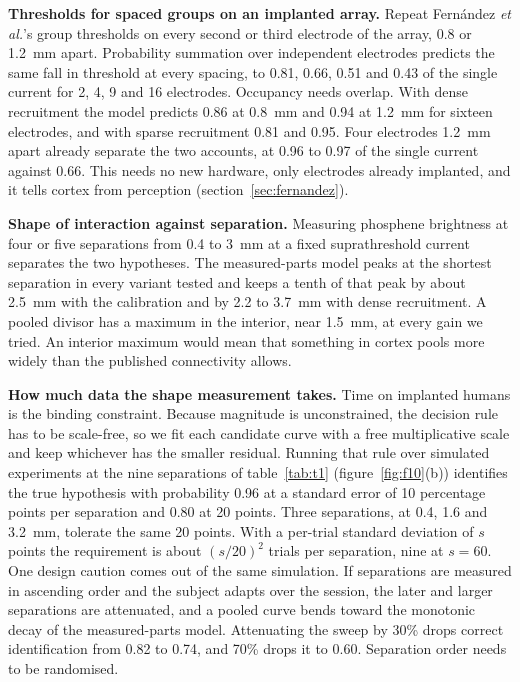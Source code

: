\documentclass[10pt,twocolumn]{article}
\begin{document}
\textbf{Thresholds for spaced groups on an implanted array.} Repeat
Fern\'andez \textit{et al.}'s group thresholds on every second or third
electrode of the array, 0.8 or 1.2~mm apart. Probability summation over
independent electrodes predicts the same fall in threshold at every
spacing, to 0.81, 0.66, 0.51 and 0.43 of the single current for 2, 4, 9
and 16 electrodes. Occupancy needs overlap. With dense recruitment the
model predicts 0.86 at 0.8~mm and 0.94 at 1.2~mm for sixteen electrodes,
and with sparse recruitment 0.81 and 0.95. Four electrodes 1.2~mm apart
already separate the two accounts, at 0.96 to 0.97 of the single
current against 0.66. This needs no new hardware, only electrodes already implanted, and
it tells cortex from perception (section~\ref{sec:fernandez}).

\textbf{Shape of interaction against separation.} Measuring phosphene
brightness at four or five separations from 0.4 to 3~mm at a fixed
suprathreshold current separates the two hypotheses. The measured-parts
model peaks at the shortest separation in every variant tested and keeps
a tenth of that peak by about 2.5~mm with the calibration and by 2.2 to
3.7~mm with dense recruitment. A pooled divisor has a maximum in
the interior, near 1.5~mm, at every gain we tried.
An interior maximum would mean that something in cortex pools more widely
than the published connectivity allows.

\textbf{How much data the shape measurement takes.} Time on implanted
humans is the binding constraint. Because magnitude is unconstrained, the
decision rule has to be scale-free, so we fit each candidate curve with a
free multiplicative scale and keep whichever has the smaller residual.
Running that rule over simulated experiments at the nine separations of
table~\ref{tab:t1} (figure~\ref{fig:f10}(b)) identifies the true
hypothesis with probability 0.96 at a standard error of 10 percentage
points per separation and 0.80 at 20 points. Three separations, at 0.4,
1.6 and 3.2~mm, tolerate the same 20 points. With a per-trial standard
deviation of $s$ points the requirement is about $(s/20)^2$ trials per
separation, nine at $s = 60$. One design caution comes out of the same
simulation. If separations are measured in ascending order and the subject
adapts over the session, the later and larger separations are attenuated,
and a pooled curve bends toward the monotonic decay of the measured-parts
model. Attenuating the sweep by 30\% drops correct identification from
0.82 to 0.74, and 70\% drops it to 0.60. Separation order needs to be
randomised.
\end{document}
